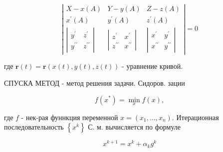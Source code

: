 \documentclass[10pt]{article}
\begin{document}
\[

\left|\begin{array}{ccc}

X-x(A) & Y-y(A) & Z-z(A) \\

x^{\prime}(A) & y^{\prime}(A) & z^{\prime}(A) \\

\left|\begin{array}{cc}

y^{\prime} & z^{\prime} \\

y^{\prime \prime} & z^{\prime \prime}

\end{array}\right| & \left|\begin{array}{cc}

z^{\prime} & x^{\prime} \\

z^{\prime \prime} & x^{\prime \prime}

\end{array}\right| & \left|\begin{array}{ll}

x^{\prime} & y^{\prime} \\

x^{\prime \prime} & y^{\prime \prime}

\end{array}\right|

\end{array}\right|=0

\]



где $\boldsymbol{r}(t)=\boldsymbol{r}(x(t), y(t), z(t))$ - уравнение кривой.



СПУСКА МЕТОД - метод решения задачи. Сидоров. зации



\[

f\left(x^{*}\right)=\min _{x} f(x),

\]



где $f$ - нек-рая фуннкция переменной $x=\left(x_{1}, \ldots, x_{n}\right)$. Итерационная последовательность $\left\{x^{k}\right\}$ С. м. вычисляется по формуле



\[

x^{k+1}=x^{k}+\alpha_{k} g^{k}

\]
\end{document}
